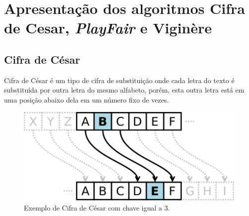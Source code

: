 \documentclass[
article,			%
11pt,				%
oneside,			%
a4paper,			%
english,			%
brazil,				%
sumario=tradicional
]{abntex2}
\begin{document}
	
	\frenchspacing 
	
	
	\maketitle
	
	
	
	\textual
	
	\section{Apresentação dos algoritmos Cifra de Cesar, \textit{PlayFair} e Viginère}
	
		\subsection{Cifra de César}
				Cifra de César é um tipo de cifra de substituição onde cada letra do texto é substituída por outra letra do mesmo alfabeto, porém, esta outra letra está em uma posição abaixo dela em um número fixo de vezes.
				
				
				\begin{figure} [!h]
				\centering
				\includegraphics[width=0.7\linewidth]{Imagens/cesar}
				\caption{Exemplo de Cifra de César com chave igual a 3.}
				\label{fig:cesar}
				\end{figure}
				
\end{document}
